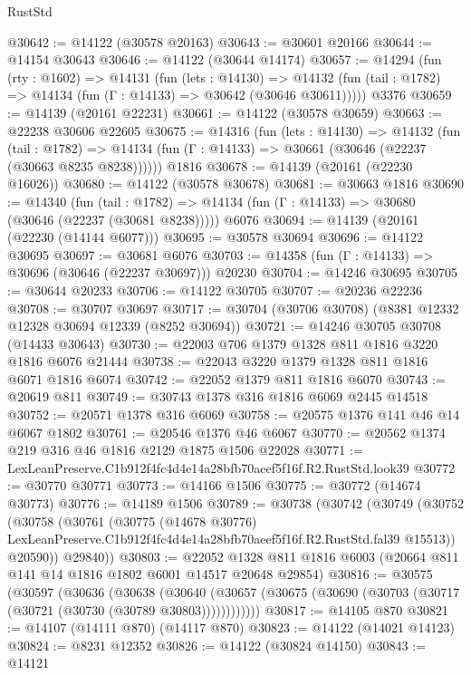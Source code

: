 \begin{lexlean}{RustStd}
\begin{coremodule}
@30642 := @14122 (@30578 @20163)
@30643 := @30601 @20166
@30644 := @14154 @30643
@30646 := @14122 (@30644 @14174)
@30657 := @14294
    (fun (rty : @1602) =>
    @14131
      (fun (lets : @14130) =>
      @14132 (fun (tail : @1782) => @14134 (fun (Γ : @14133) => @30642 (@30646 @30611)))))
    @3376
@30659 := @14139 (@20161 @22231)
@30661 := @14122 (@30578 @30659)
@30663 := @22238 @30606 @22605
@30675 := @14316
    (fun (lets : @14130) =>
    @14132
      (fun (tail : @1782) =>
      @14134 (fun (Γ : @14133) => @30661 (@30646 (@22237 (@30663 @8235 @8238))))))
    @1816
@30678 := @14139 (@20161 (@22230 @16026))
@30680 := @14122 (@30578 @30678)
@30681 := @30663 @1816
@30690 := @14340
    (fun (tail : @1782) => @14134 (fun (Γ : @14133) => @30680 (@30646 (@22237 (@30681 @8238)))))
    @6076
@30694 := @14139 (@20161 (@22230 (@14144 @6077)))
@30695 := @30578 @30694
@30696 := @14122 @30695
@30697 := @30681 @6076
@30703 := @14358 (fun (Γ : @14133) => @30696 (@30646 (@22237 @30697))) @20230
@30704 := @14246 @30695
@30705 := @30644 @20233
@30706 := @14122 @30705
@30707 := @20236 @22236
@30708 := @30707 @30697
@30717 := @30704 (@30706 @30708) (@8381 @12332 @12328 @30694 @12339 (@8252 @30694))
@30721 := @14246 @30705 @30708 (@14433 @30643)
@30730 := @22003 @706 @1379 @1328 @811 @1816 @3220 @1816 @6076 @21444
@30738 := @22043 @3220 @1379 @1328 @811 @1816 @6071 @1816 @6074
@30742 := @22052 @1379 @811 @1816 @6070
@30743 := @20619 @811
@30749 := @30743 @1378 @316 @1816 @6069 @2445 @14518
@30752 := @20571 @1378 @316 @6069
@30758 := @20575 @1376 @141 @46 @14 @6067 @1802
@30761 := @20546 @1376 @46 @6067
@30770 := @20562 @1374 @219 @316 @46 @1816 @2129 @1875 @1506 @22028
@30771 := LexLeanPreserve.C1b912f4fc4d4e14a28bfb70aeef5f16f.R2.RustStd.look39
@30772 := @30770 @30771
@30773 := @14166 @1506
@30775 := @30772 (@14674 @30773)
@30776 := @14189 @1506
@30789 := @30738
    (@30742
      (@30749
        (@30752
          (@30758
            (@30761
              (@30775
                (@14678 @30776)
                LexLeanPreserve.C1b912f4fc4d4e14a28bfb70aeef5f16f.R2.RustStd.fal39
                @15513))
            @20590))
        @29840))
@30803 := @22052
    @1328
    @811
    @1816
    @6003
    (@20664 @811 @141 @14 @1816 @1802 @6001 @14517 @20648 @29854)
@30816 := @30575
    (@30597
      (@30636
        (@30638
          (@30640 (@30657 (@30675 (@30690 (@30703 (@30717 (@30721 (@30730 (@30789 @30803))))))))))))
@30817 := @14105 @870
@30821 := @14107 (@14111 @870) (@14117 @870)
@30823 := @14122 (@14021 @14123)
@30824 := @8231 @12352
@30826 := @14122 (@30824 @14150)
@30843 := @14121

\end{coremodule}
\end{lexlean}
